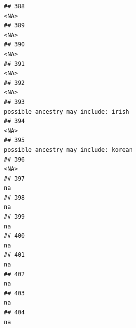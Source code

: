 \documentclass[]{article}
\begin{document}
\begin{verbatim}
## 388                                                                                                                                                <NA>
## 389                                                                                                                                                <NA>
## 390                                                                                                                                                <NA>
## 391                                                                                                                                                <NA>
## 392                                                                                                                                                <NA>
## 393                                                                                                                possible ancestry may include: irish
## 394                                                                                                                                                <NA>
## 395                                                                                                               possible ancestry may include: korean
## 396                                                                                                                                                <NA>
## 397                                                                                                                                                  na
## 398                                                                                                                                                  na
## 399                                                                                                                                                  na
## 400                                                                                                                                                  na
## 401                                                                                                                                                  na
## 402                                                                                                                                                  na
## 403                                                                                                                                                  na
## 404                                                                                                                                                  na

\end{verbatim}
\end{document}
